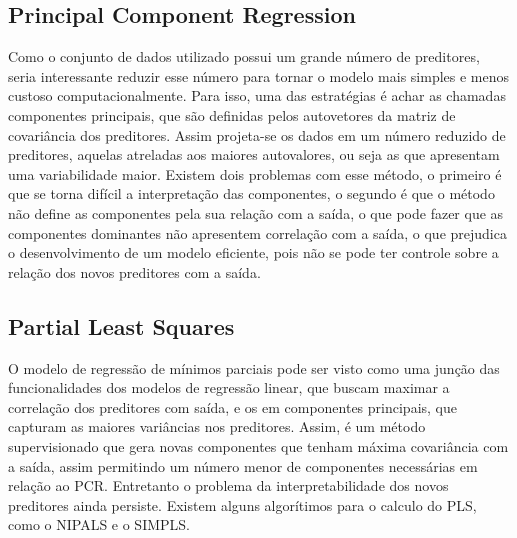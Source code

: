 \subsection{Principal Component Regression}
Como o conjunto de dados utilizado possui um grande
número de preditores, seria interessante reduzir esse número para tornar o modelo mais simples e menos custoso computacionalmente. Para isso, uma das estratégias é achar as chamadas componentes principais, que são definidas pelos autovetores da matriz de covariância dos preditores. Assim projeta-se os dados em um número reduzido de preditores, aquelas atreladas aos maiores autovalores, ou seja as que apresentam uma variabilidade maior. Existem dois problemas com esse método, o primeiro é que se torna difícil a interpretação das componentes, o segundo é que o método não define as componentes pela sua relação com a saída, o que pode fazer que as componentes dominantes não apresentem correlação com a saída, o que prejudica o desenvolvimento de um modelo eficiente, pois não se pode ter controle sobre a relação dos novos preditores com a saída.

\subsection{Partial Least Squares}
O modelo de regressão de mínimos parciais pode ser visto como uma junção das funcionalidades dos modelos de regressão linear, que buscam maximar a correlação dos preditores com saída, e os em componentes principais, que capturam as maiores variâncias nos preditores. Assim, é um método supervisionado que gera novas componentes que tenham máxima covariância com a saída, assim permitindo um número menor de componentes necessárias em relação ao PCR. Entretanto o problema da interpretabilidade dos novos preditores ainda persiste. Existem alguns algorítimos para o calculo do PLS, como o NIPALS e o SIMPLS.